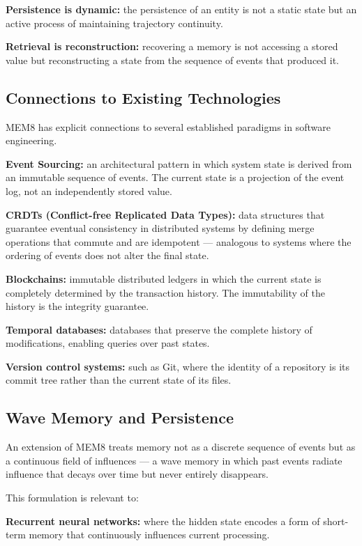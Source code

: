 \documentclass[11pt, a4paper]{article}
\theoremstyle{named}
\begin{document}
\textbf{Persistence is dynamic:} the persistence of an entity is not
a static state but an active process of maintaining trajectory
continuity.

\textbf{Retrieval is reconstruction:} recovering a memory is not
accessing a stored value but reconstructing a state from the sequence
of events that produced it.

\subsection{Connections to Existing Technologies}

MEM\textbar{}8 has explicit connections to several established
paradigms in software engineering.

\textbf{Event Sourcing:} an architectural pattern in which system
state is derived from an immutable sequence of events. The current
state is a projection of the event log, not an independently stored
value.

\textbf{CRDTs (Conflict-free Replicated Data Types):} data structures
that guarantee eventual consistency in distributed systems by defining
merge operations that commute and are idempotent --- analogous to
systems where the ordering of events does not alter the final state.

\textbf{Blockchains:} immutable distributed ledgers in which the
current state is completely determined by the transaction history.
The immutability of the history is the integrity guarantee.

\textbf{Temporal databases:} databases that preserve the complete
history of modifications, enabling queries over past states.

\textbf{Version control systems:} such as Git, where the identity of
a repository is its commit tree rather than the current state of
its files.

\subsection{Wave Memory and Persistence}

An extension of MEM\textbar{}8 treats memory not as a discrete
sequence of events but as a continuous field of influences --- a
wave memory in which past events radiate influence that decays over
time but never entirely disappears.

This formulation is relevant to:

\textbf{Recurrent neural networks:} where the hidden state encodes
a form of short-term memory that continuously influences current
processing.
\end{document}
